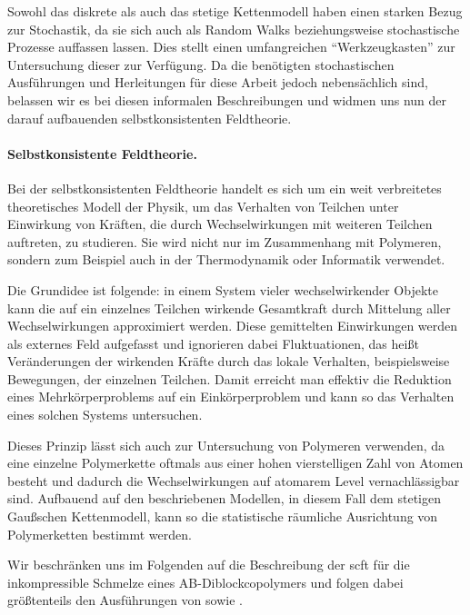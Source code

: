 \documentclass[../main.tex]{subfiles}
\begin{document}
Sowohl das diskrete als auch das stetige Kettenmodell haben einen starken Bezug zur Stochastik, da sie sich auch als Random Walks beziehungsweise stochastische Prozesse auffassen lassen.
Dies stellt einen umfangreichen \enquote{Werkzeugkasten} zur Untersuchung dieser zur Verfügung.
Da die benötigten stochastischen Ausführungen und Herleitungen für diese Arbeit jedoch nebensächlich sind, belassen wir es bei diesen informalen Beschreibungen und widmen uns nun der darauf aufbauenden selbstkonsistenten Feldtheorie.


\paragraph{Selbstkonsistente Feldtheorie.} %

Bei der selbstkonsistenten Feldtheorie handelt es sich um ein weit verbreitetes theoretisches Modell der Physik, um das Verhalten von Teilchen unter Einwirkung von Kräften, die durch Wechselwirkungen mit weiteren Teilchen auftreten, zu studieren.
Sie wird nicht nur im Zusammenhang mit Polymeren, sondern zum Beispiel auch in der Thermodynamik oder Informatik verwendet.

Die Grundidee ist folgende: in einem System vieler wechselwirkender Objekte kann die auf ein einzelnes Teilchen wirkende Gesamtkraft durch Mittelung aller Wechselwirkungen approximiert werden.
Diese gemittelten Einwirkungen werden als externes Feld aufgefasst und ignorieren dabei Fluktuationen, das heißt Veränderungen der wirkenden Kräfte durch das lokale Verhalten, beispielsweise Bewegungen, der einzelnen Teilchen.
Damit erreicht man effektiv die Reduktion eines Mehrkörperproblems auf ein Einkörperproblem und kann so das Verhalten eines solchen Systems untersuchen.

Dieses Prinzip lässt sich auch zur Untersuchung von Polymeren verwenden, da eine einzelne Polymerkette oftmals aus einer hohen vierstelligen Zahl von Atomen besteht und dadurch die Wechselwirkungen auf atomarem Level vernachlässigbar sind.
Aufbauend auf den beschriebenen Modellen, in diesem Fall dem stetigen Gaußschen Kettenmodell, kann so die statistische räumliche Ausrichtung von Polymerketten bestimmt werden.

Wir beschränken uns im Folgenden auf die Beschreibung der \ac{scft} für die inkompressible Schmelze eines AB-Diblockcopolymers und folgen dabei größtenteils den Ausführungen von \textcite{Matsen:1994bz} sowie \textcite{Stasiak:2011ba}.
\end{document}
